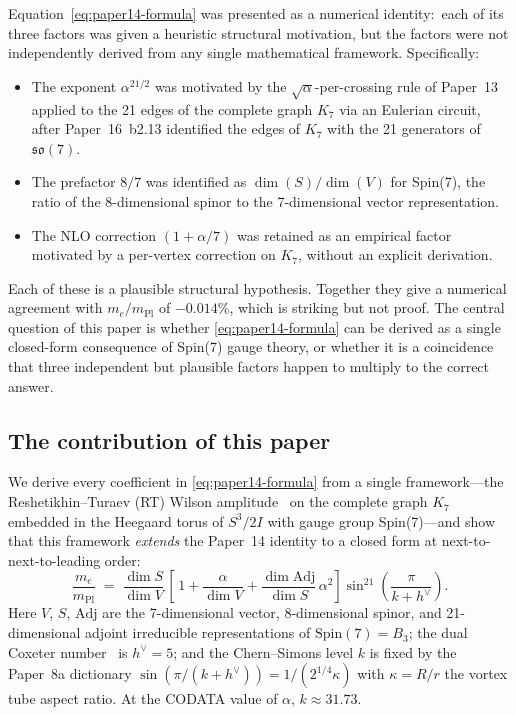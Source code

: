 \documentclass[11pt]{article}
\newcommand{\so}{\mathfrak{so}}
\newcommand{\Spin}{\mathrm{Spin}}
\newcommand{\Adj}{\mathrm{Adj}}
\newcommand{\mPl}{m_{\mathrm{Pl}}}
\newcommand{\hv}{h^{\vee}}
\begin{document}
Equation~\eqref{eq:paper14-formula} was presented as a numerical
identity:\ each of its three factors was given a heuristic
structural motivation, but the factors were not independently
derived from any single mathematical framework.  Specifically:

\begin{itemize}
\item The exponent $\alpha^{21/2}$ was motivated by the
  $\sqrt{\alpha}$-per-crossing rule of Paper~13~\cite{paper13}
  applied to the 21 edges of the complete graph $K_7$ via an
  Eulerian circuit, after Paper~16~b2.13 identified the edges of
  $K_7$ with the 21 generators of $\so(7)$.
\item The prefactor $8/7$ was identified as
  $\dim(S)/\dim(V)$ for Spin(7), the ratio of the 8-dimensional
  spinor to the 7-dimensional vector representation.
\item The NLO correction $(1 + \alpha/7)$ was retained as an
  empirical factor motivated by a per-vertex correction on $K_7$,
  without an explicit derivation.
\end{itemize}

\noindent
Each of these is a plausible structural hypothesis.  Together they
give a numerical agreement with $m_e/\mPl$ of $-0.014\%$, which is
striking but not proof.  The central question of this paper is
whether \eqref{eq:paper14-formula} can be derived as a single
closed-form consequence of Spin(7) gauge theory, or whether it is a
coincidence that three independent but plausible factors happen to
multiply to the correct answer.

\subsection{The contribution of this paper}
\label{sec:intro-contribution}

We derive every coefficient in \eqref{eq:paper14-formula} from a
single framework---the Reshetikhin--Turaev (RT) Wilson
amplitude~\cite{witten1989,reshetikhin-turaev} on
the complete graph $K_7$ embedded in the Heegaard torus of
$S^3/2I$ with gauge group Spin(7)---and show that this framework
\emph{extends} the Paper~14 identity to a closed form at
next-to-next-to-leading order:
\begin{equation}
  \boxed{\quad
    \frac{m_e}{\mPl}
    \;=\;
    \frac{\dim S}{\dim V}\,
    \left[\, 1
      + \frac{\alpha}{\dim V}
      + \frac{\dim \Adj}{\dim S}\,\alpha^2
    \right]
    \sin^{21}\!\left(\frac{\pi}{k + \hv}\right).
  \quad}
  \label{eq:intro-main}
\end{equation}
Here $V$, $S$, $\Adj$ are the 7-dimensional vector, 8-dimensional
spinor, and 21-dimensional adjoint irreducible representations of
$\Spin(7) = B_3$; the dual Coxeter number~\cite{coxeter1973} is
$\hv = 5$; and the
Chern--Simons level $k$ is fixed by the Paper~8a dictionary
$\sin(\pi/(k+\hv)) = 1/(2^{1/4}\kappa)$ with $\kappa = R/r$ the
vortex tube aspect ratio.  At the CODATA value of $\alpha$,
$k \approx 31.73$.
\end{document}
